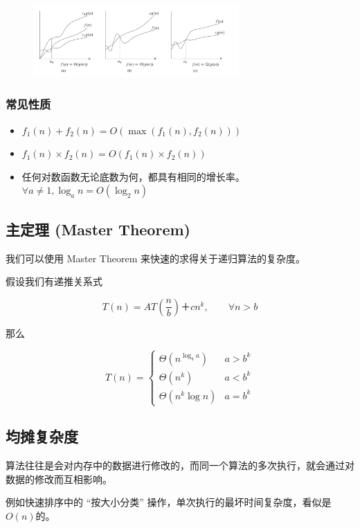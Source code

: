 \begin{figure}[htbp]
\centering
\includegraphics[width=0.7\textwidth]{docs/misc/images/order.png} 

\end{figure}

\subsubsection{常见性质}

\begin{itemize}
\item $f_1(n) + f_2(n) = O(\max(f_1(n), f_2(n)))$
\item $f_1(n) \times f_2(n) = O(f_1(n) \times f_2(n))$
\item 任何对数函数无论底数为何，都具有相同的增长率。$\forall a \neq 1, \log_a{n} = O(\log_2 n)$
\end{itemize}

\subsection{主定理 (Master Theorem)}

我们可以使用 Master Theorem 来快速的求得关于递归算法的复杂度。

假设我们有递推关系式

$$
T(n) = AT\left(\frac{n}{b}\right)＋cn^k, \qquad \forall n > b
$$

那么

$$
T(n) = \begin{cases}\Theta(n^{\log_b a}) & a > b^k \\ \Theta(n^k) & a< b^k \\ \Theta(n^k\log n ) & a = b^k \end{cases}
$$

\subsection{均摊复杂度}

算法往往是会对内存中的数据进行修改的，而同一个算法的多次执行，就会通过对数据的修改而互相影响。

例如快速排序中的 “按大小分类” 操作，单次执行的最坏时间复杂度，看似是$O(n)$的。

